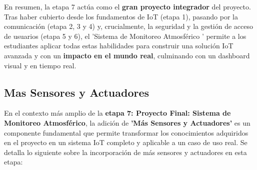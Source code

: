\documentclass{report}
\begin{document}
En resumen, la etapa 7 actúa como el \textbf{gran proyecto integrador} del proyecto. Tras haber cubierto desde los fundamentos de IoT (etapa 1), 
pasando por la comunicación (etapa 2, 3 y 4) y, crucialmente, la seguridad y la gestión de acceso de usuarios (etapa 5 y 6), el  'Sistema de 
Monitoreo Atmosférico ' permite a los estudiantes aplicar todas estas habilidades para construir una solución IoT avanzada y con un \textbf{impacto 
en el mundo real}, culminando con un dashboard visual y en tiempo real.

\subsection{Mas Sensores y Actuadores}
En el contexto más amplio de la \textbf{etapa 7: Proyecto Final: Sistema de Monitoreo Atmosférico}, la adición de \textbf{ 'Más Sensores y Actuadores'} 
es un componente fundamental que permite transformar los conocimientos adquiridos en el proyecto en un sistema IoT completo y aplicable a un caso de uso real. 
Se detalla lo siguiente sobre la incorporación de más sensores y actuadores en esta etapa:
\end{document}
